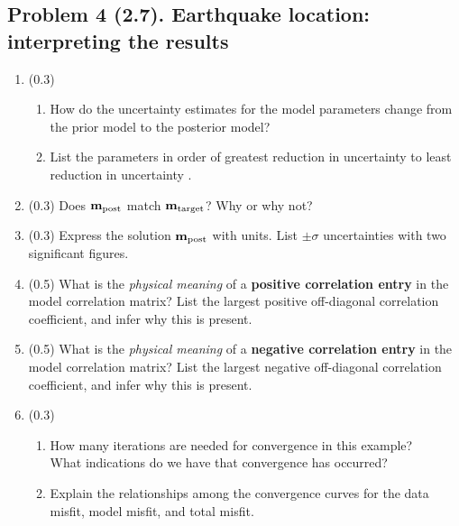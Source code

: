\documentclass[11pt,titlepage,fleqn]{article}
\begin{document}

\pagebreak
\subsection*{Problem 4 (2.7). Earthquake location: interpreting the results}

\begin{enumerate}

\item (0.3)
\begin{enumerate}
\item How do the uncertainty estimates for the model parameters change from the prior model to the posterior model?
\item List the parameters in order of greatest reduction in uncertainty to least reduction in uncertainty .
\end{enumerate}


\item (0.3) Does $\mbox{${\bf m}$}_{\rm post}$ match $\mbox{${\bf m}$}_{\rm target}$? Why or why not?


\item (0.3) Express the solution $\mbox{${\bf m}$}_{\rm post}$ with units. List $\pm\sigma$ uncertainties with two significant figures.


\item (0.5) What is the {\em physical meaning} of a {\bf positive correlation entry} in the model correlation matrix? List the largest positive off-diagonal correlation coefficient, and infer why this is present.


\item (0.5) What is the {\em physical meaning} of a {\bf negative correlation entry} in the model correlation matrix? List the largest negative off-diagonal correlation coefficient, and infer why this is present.


\item (0.3)
%
\begin{enumerate}
\item How many iterations are needed for convergence in this example? \\
      What indications do we have that convergence has occurred?
\item Explain the relationships among the convergence curves for the data misfit, model misfit, and total misfit.
\end{enumerate}


\end{enumerate}
\end{document}
